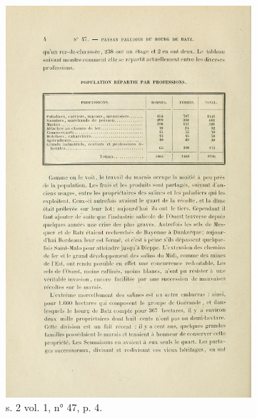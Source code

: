 \begin{figure}
    \centering
    \begin{subfigure}[t]{0.4\textwidth}
     \includegraphics[width=0.8\linewidth]{img/tabl_s2t1_m47_p4.png}
     \caption{s. 2 vol. 1, n° 47, p. 4.}
    \end{subfigure}
    \hspace{5pt}
    \begin{subfigure}[t]{0.4\textwidth}

\end{subfigure}
\end{figure}
